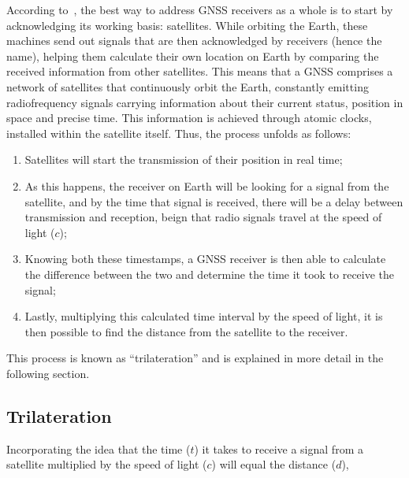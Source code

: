 According to~\cite{novatel_gnss}, the best way to address GNSS receivers as a whole is to start by acknowledging its working basis: satellites. While orbiting the Earth, these machines send out signals that are then acknowledged by receivers (hence the name), helping them calculate their own location on Earth by comparing the received information from other satellites.
This means that a GNSS comprises a network of satellites that continuously orbit the Earth, constantly emitting radiofrequency signals carrying information about their current status, position in space and precise time.
This information is achieved through atomic clocks, installed within the satellite itself. Thus, the process unfolds as follows:

\begin{enumerate}
    \item Satellites will start the transmission of their position in real time;
    \item As this happens, the receiver on Earth will be looking for a signal from the satellite, and by the time that signal is received, there will be a delay between transmission and reception, beign that radio signals travel at the speed of light ($c$);
    \item Knowing both these timestamps, a GNSS receiver is then able to calculate the difference between the two and determine the time it took to receive the signal;
    \item Lastly, multiplying this calculated time interval by the speed of light, it is then possible to find the distance from the satellite to the receiver.
\end{enumerate}
This process is known as ``trilateration'' and is explained in more detail in the following section.

\subsection{Trilateration}\label{sec:II_gnss_trilateration}

Incorporating the idea that the time ($t$) it takes to receive a signal from a satellite multiplied by the speed of light ($c$) will equal the distance ($d$),

